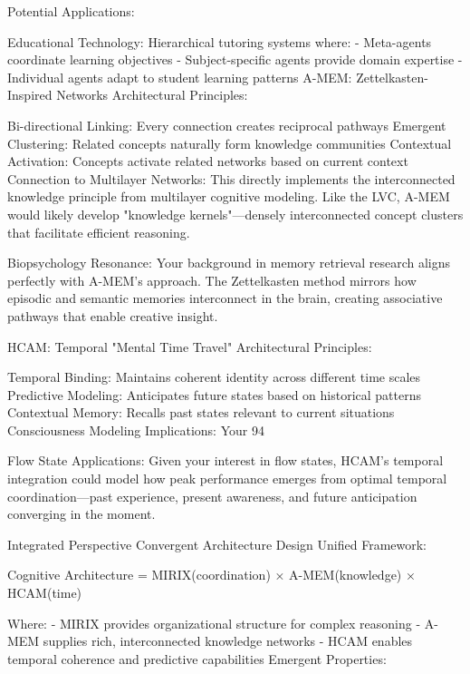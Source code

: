 {Potential Applications:

Educational Technology: Hierarchical tutoring systems where:
- Meta-agents coordinate learning objectives
- Subject-specific agents provide domain expertise
- Individual agents adapt to student learning patterns
A-MEM: Zettelkasten-Inspired Networks
Architectural Principles:

Bi-directional Linking: Every connection creates reciprocal pathways
Emergent Clustering: Related concepts naturally form knowledge communities
Contextual Activation: Concepts activate related networks based on current context
Connection to Multilayer Networks: This directly implements the interconnected knowledge principle from multilayer cognitive modeling. Like the LVC, A-MEM would likely develop "knowledge kernels"—densely interconnected concept clusters that facilitate efficient reasoning.

Biopsychology Resonance: Your background in memory retrieval research aligns perfectly with A-MEM's approach. The Zettelkasten method mirrors how episodic and semantic memories interconnect in the brain, creating associative pathways that enable creative insight.

HCAM: Temporal "Mental Time Travel"
Architectural Principles:

Temporal Binding: Maintains coherent identity across different time scales
Predictive Modeling: Anticipates future states based on historical patterns
Contextual Memory: Recalls past states relevant to current situations
Consciousness Modeling Implications: Your 94%

Flow State Applications: Given your interest in flow states, HCAM's temporal integration could model how peak performance emerges from optimal temporal coordination—past experience, present awareness, and future anticipation converging in the moment.

Integrated Perspective
Convergent Architecture Design
Unified Framework:

Cognitive Architecture = MIRIX(coordination) × A-MEM(knowledge) × HCAM(time)

Where:
- MIRIX provides organizational structure for complex reasoning
- A-MEM supplies rich, interconnected knowledge networks
- HCAM enables temporal coherence and predictive capabilities
Emergent Properties:

}
